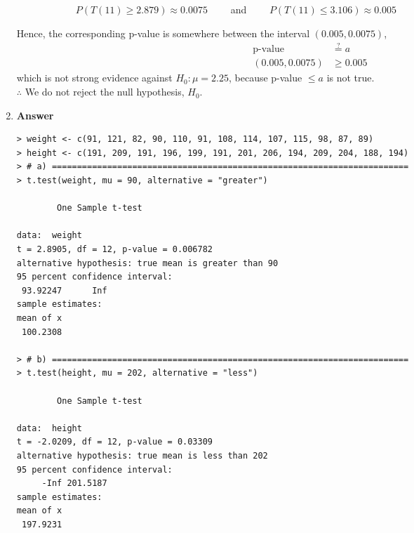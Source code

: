 \documentclass[12pt]{book}
\begin{document}
\begin{enumerate}
    $\qquad \qquad \qquad P(T(11) \geq 2.879) \approx 0.0075 \qquad$ and $\qquad P(T(11) \leq 3.106) \approx 0.005$
    
    Hence, the corresponding p-value is somewhere between the interval $(0.005, 0.0075)$, 
    \begin{align*}
        \text{p-value} &\stackrel{?}{=} a\\
        (0.005, 0.0075) &\geq 0.005
    \end{align*}
    which is not strong evidence against $H_0:\mu = 2.25$, because p-value $\leq a$ is not true.\\
    
    $\therefore$ We do not reject the null hypothesis, $H_0$.
        
    \newpage
    
    \item \textbf{Answer}
    
\begin{verbatim}
> weight <- c(91, 121, 82, 90, 110, 91, 108, 114, 107, 115, 98, 87, 89)
> height <- c(191, 209, 191, 196, 199, 191, 201, 206, 194, 209, 204, 188, 194)
> # a) =======================================================================
> t.test(weight, mu = 90, alternative = "greater")

        One Sample t-test

data:  weight
t = 2.8905, df = 12, p-value = 0.006782
alternative hypothesis: true mean is greater than 90
95 percent confidence interval:
 93.92247      Inf
sample estimates:
mean of x 
 100.2308 

> # b) =======================================================================
> t.test(height, mu = 202, alternative = "less")

        One Sample t-test

data:  height
t = -2.0209, df = 12, p-value = 0.03309
alternative hypothesis: true mean is less than 202
95 percent confidence interval:
     -Inf 201.5187
sample estimates:
mean of x 
 197.9231 


\end{verbatim}
\end{enumerate}
\end{document}

